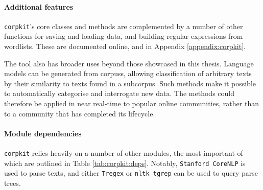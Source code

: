 

\paragraph{Additional features}

\texttt{corpkit}'s core classes and methods are complemented by a number of other functions for saving and loading data, and building regular expressions from wordlists. These are documented online, and in Appendix \ref{appendix:corpkit}.

The tool also has broader uses beyond those showcased in this thesis. Language models can be generated from \glspl{corpus}, allowing classification of arbitrary texts by their similarity to texts found in a subcorpus. Such methods make it possible to automatically categorise and interrogate new data. The methods could therefore be applied in near real\hyp{}time to popular online communities, rather than to a community that has completed its lifecycle.

\paragraph{Module dependencies}

\texttt{corpkit} relies heavily on a number of other modules, the most important of which are outlined in Table \ref{tab:corpkit:deps}. Notably, \texttt{Stanford CoreNLP} is used to parse texts, and either \texttt{Tregex} or \texttt{nltk\_tgrep} can be used to query parse trees.


